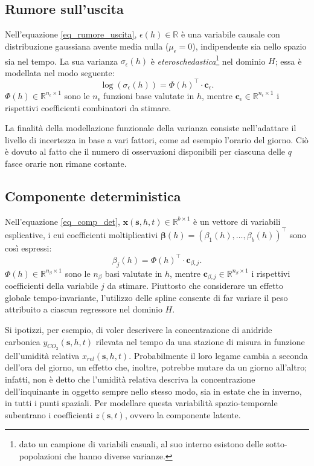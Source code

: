 \subsection[Rumore sull'uscita]{Rumore sull'uscita}
Nell'equazione \ref{eq_rumore_uscita}, $\epsilon (h)\in\mathbb{R}$ è una variabile causale con distribuzione gaussiana avente media nulla ($\mu_\epsilon = 0$), indipendente sia nello spazio sia nel tempo. La sua varianza $\sigma_\epsilon (h)$ è \textit{eteroschedastica}\footnote{dato un campione di variabili casuali, al suo interno esistono delle sotto-popolazioni che hanno diverse varianze.} nel dominio $H$; essa è modellata nel modo seguente:
\begin{equation}
	\log(\sigma_\epsilon(h)) = \Phi(h)^\top\cdot\mathbf{c}_\epsilon.
\end{equation}
$\Phi(h)\in\mathbb{R}^{n_\epsilon\times 1}$ sono le $n_\epsilon$ funzioni base valutate in $h$, mentre $\mathbf{c}_\epsilon\in\mathbb{R}^{n_\epsilon\times 1}$ i rispettivi coefficienti combinatori da stimare. \par La finalità della modellazione funzionale della varianza consiste nell'adattare il livello di incertezza in base a vari fattori, come ad esempio l'orario del giorno. Ciò è dovuto al fatto che il numero di osservazioni disponibili per ciascuna delle $q$ fasce orarie non rimane costante.

\subsection[Componente deterministica]{Componente deterministica}
Nell'equazione \ref{eq_comp_det}, $\mathbf{x}(\mathbf{s}, h, t)\in\mathbb{R}^{b\times 1}$ è un vettore di variabili esplicative, i cui coefficienti moltiplicativi $\boldsymbol{\beta}(h) = (\beta_1(h),\dots,\beta_b(h))^\top$ sono così espressi:
\begin{equation}
	\beta_j(h) = \Phi(h)^\top\cdot\mathbf{c}_{\beta, j}.
\end{equation}
$\Phi(h)\in\mathbb{R}^{n_\beta\times 1}$ sono le $n_\beta$ basi valutate in $h$, mentre $\mathbf{c}_{\beta, j}\in\mathbb{R}^{n_\beta\times 1}$ i rispettivi coefficienti della variabile $j$ da stimare. Piuttosto che considerare un effetto globale tempo-invariante, l'utilizzo delle spline consente di far variare il peso attribuito a ciascun regressore nel dominio $H$. \par Si ipotizzi, per esempio, di voler descrivere la concentrazione di anidride carbonica $y_{CO_2}(\mathbf{s}, h, t)$ rilevata nel tempo da una stazione di misura in funzione dell'umidità relativa $x_{rel}(\mathbf{s}, h, t)$. Probabilmente il loro legame cambia a seconda dell'ora del giorno, un effetto che, inoltre, potrebbe mutare da un giorno all'altro; infatti, non è detto che l'umidità relativa descriva la concentrazione dell'inquinante in oggetto sempre nello stesso modo, sia in estate che in inverno, in tutti i punti spaziali. Per modellare questa variabilità spazio-temporale subentrano i coefficienti $z(\mathbf{s}, t)$, ovvero la componente latente.

